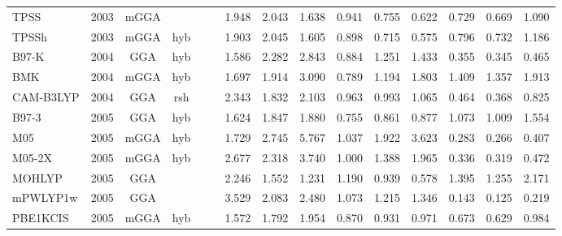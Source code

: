 \begin{landscape}
\begin{longtable}{lcccccrrrrrrrrr}
    TPSS             & 2003 & mGGA &          &             &           & 1.948             & 2.043             & 1.638  & 0.941              & 0.755             & 0.622  & 0.729   & 0.669 & 1.090 \\
    TPSSh            & 2003 & mGGA & hyb      &             &           & 1.903             & 2.045             & 1.605  & 0.898              & 0.715             & 0.575  & 0.796   & 0.732 & 1.186 \\
    B97-K            & 2004 & GGA  & hyb      &             &           & 1.586             & 2.282             & 2.843  & 0.884              & 1.251             & 1.433  & 0.355   & 0.345 & 0.465 \\
    BMK              & 2004 & mGGA & hyb      &             &           & 1.697             & 1.914             & 3.090  & 0.789              & 1.194             & 1.803  & 1.409   & 1.357 & 1.913 \\
    CAM-B3LYP        & 2004 & GGA  & rsh      &             &           & 2.343             & 1.832             & 2.103  & 0.963              & 0.993             & 1.065  & 0.464   & 0.368 & 0.825 \\
    B97-3            & 2005 & GGA  & hyb      &             &           & 1.624             & 1.847             & 1.880  & 0.755              & 0.861             & 0.877  & 1.073   & 1.009 & 1.554 \\
    M05              & 2005 & mGGA & hyb      &             &           & 1.729             & 2.745             & 5.767  & 1.037              & 1.922             & 3.623  & 0.283   & 0.266 & 0.407 \\
    M05-2X           & 2005 & mGGA & hyb      &             &           & 2.677             & 2.318             & 3.740  & 1.000              & 1.388             & 1.965  & 0.336   & 0.319 & 0.472 \\
    MOHLYP           & 2005 & GGA  &          &             &           & 2.246             & 1.552             & 1.231  & 1.190              & 0.939             & 0.578  & 1.395   & 1.255 & 2.171 \\
    mPWLYP1w         & 2005 & GGA  &          &             &           & 3.529             & 2.083             & 2.480  & 1.073              & 1.215             & 1.346  & 0.143   & 0.125 & 0.219 \\
    PBE1KCIS         & 2005 & mGGA & hyb      &             &           & 1.572             & 1.792             & 1.954  & 0.870              & 0.931             & 0.971  & 0.673   & 0.629 & 0.984 \\

\end{longtable}
\end{landscape}
